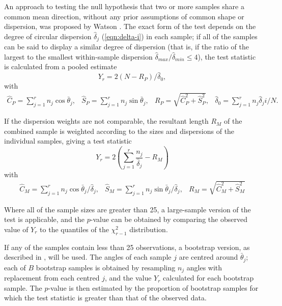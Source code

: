 \documentclass[../../ArchStats.tex]{subfiles}
\begin{document}
An approach to testing the null hypothesis that two or more samples share a common mean direction, without any prior assumptions of common shape or dispersion, was proposed by Watson \cite{Watson1983}. The exact form of the test depends on the degree of circular dispersion $\hat{\delta}_j$ (\ref{eqn:delta-i}) in each sample; if all of the samples can be said to display a similar degree of dispersion (that is, if the ratio of the largest to the smallest within-sample dispersion $\hat{\delta}_{max} / \hat{\delta}_{min} \leq 4$), the test statistic is calculated from a pooled estimate
\begin{equation}
Y_r = 2(N - R_P) / \hat{\delta}_0,
\end{equation}
with
\begin{equation}
\begin{matrix*}
\hat{C}_P = \sum_{j=1}^r n_j \cos \bar{\theta}_j, &
\hat{S}_P = \sum_{j=1}^r n_j \sin \bar{\theta}_j, &
R_P = \sqrt{\hat{C}_P^2 + \hat{S}_P^2}, &
\hat{\delta}_0 = \sum_{j=1}^r n_j \hat{\delta}_ji / N.
\end{matrix*}
\end{equation}


If the dispersion weights are not comparable, the resultant length $R_M$ of the combined sample is weighted according to the sizes and dispersions of the individual samples, giving a test statistic
\begin{equation}
Y_r = 2\left(\sum_{j=1}^r \frac{n_j}{\hat{\delta}_j} - R_M\right)
\end{equation}
with 
\begin{equation}
\begin{matrix*}
\hat{C}_M = \sum_{j=1}^r n_j \cos \bar{\theta}_j / \hat{\delta}_j, &
\hat{S}_M = \sum_{j=1}^r n_j \sin \bar{\theta}_j / \hat{\delta}_j, &
R_M = \sqrt{\hat{C}_M^2 + \hat{S}_M^2}
\end{matrix*}
\end{equation}

Where all of the sample sizes are greater than 25, a large-sample version of the test is applicable, and the $p$-value can be obtained by comparing the observed value of  $Y_r$ to the quantiles of the $\chi^2_{r-1}$ distribution. 

If any of the samples contain less than 25 observations, a bootstrap version, as described in \cite[section 8.4.4]{Fisher1993}, will be used. The angles of each sample $j$ are centred around $\bar{\theta}_j$; each of $B$ bootstrap samples is obtained by resampling $n_j$ angles with replacement from each centred $j$, and the value $Y_r$ calculated for each bootstrap sample. The $p$-value is then estimated by the proportion of bootstrap samples for which the test statistic is greater than that of the observed data.
\end{document}
